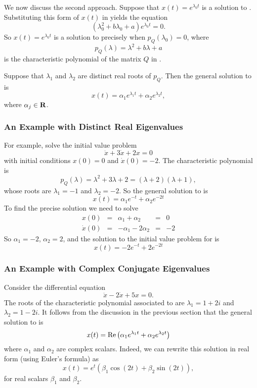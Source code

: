 We now discuss the second approach.  Suppose that $x(t)=e^{\lambda_0t}$
is a solution to .  Substituting this form of $x(t)$ in
 yields the equation
\[
\left(\lambda_0^2 + b\lambda_0 + a\right)e^{\lambda_0t} = 0.
\]
So $x(t)=e^{\lambda_0t}$ is a solution to  precisely
when $p_Q(\lambda_0)=0$, where
\begin{equation} \label{E:charQ}
p_Q(\lambda) = \lambda^2 + b\lambda + a
\end{equation}
is the characteristic polynomial of the matrix $Q$ in .

Suppose that $\lambda_1$ and $\lambda_2$ are distinct real roots of $p_Q$.
Then the general solution to  is
\[
x(t) = \alpha_1e^{\lambda_1t} +  \alpha_2e^{\lambda_2t},
\]
where $\alpha_j\in\mbox{$\bf{R}$}$.

\subsubsection*{An Example with Distinct Real Eigenvalues}

For example, solve the initial value problem
\begin{equation} \label{e:ex12}
\ddot{x} + 3\dot{x} + 2x = 0
\end{equation}
with initial conditions $x(0)=0$ and $\dot{x}(0)=-2$.  The characteristic
polynomial is
\[
p_Q(\lambda) = \lambda^2 + 3\lambda + 2 = (\lambda+2)(\lambda+1),
\]
whose roots are $\lambda_1=-1$ and $\lambda_2=-2$.  So the general solution
to  is
\[
x(t) = \alpha_1e^{-t} + \alpha_2e^{-2t}
\]
To find the precise solution we need to solve
\[
\begin{array}{rclcl}
x(0) & = & \alpha_1 + \alpha_2 & = & 0 \\
\dot{x}(0) & = & -\alpha_1 - 2\alpha_2 & = & -2
\end{array}
\]
So $\alpha_1 = -2$, $\alpha_2=2$, and the solution to the initial value problem
for  is
\[
x(t) = -2e^{-t} + 2e^{-2t}
\]

\subsubsection*{An Example with Complex Conjugate Eigenvalues}

Consider the differential equation
\begin{equation} \label{E:ex13}
\ddot{x} -2\dot{x} + 5x = 0.
\end{equation}
The roots of the characteristic polynomial associated to  are
$\lambda_1=1+2i$ and $\lambda_2=1-2i$.  It follows from the discussion in
the previous section that the general solution to  is
\[
x(t) = {\rm Re}\left(\alpha_1 e^{\lambda_1 t} + \alpha_2 e^{\lambda_2t}\right)
\]
where $\alpha_1$ and $\alpha_2$ are complex scalars.  Indeed, we can rewrite
this solution in real form (using Euler's formula) as
\[
x(t) = e^t\left(\beta_1\cos(2t) + \beta_2\sin(2t)\right),
\]
for real scalars $\beta_1$ and $\beta_2$.

